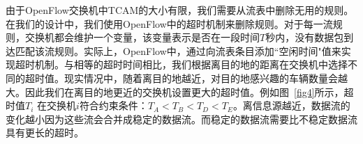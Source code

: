 \documentclass{ctexart}
\begin{document}

由于OpenFlow交换机中TCAM的大小有限，我们需要从流表中删除无用的规则。在我们的设计中，我们使用OpenFlow中的超时机制来删除规则。对于每一流规则，交换机都会维护一个变量，该变量表示是否在一段时间$T$秒内，没有数据包到达匹配该流规则。实际上，OpenFlow中，通过向流表条目添加``空闲时间"值来实现超时机制。与相等的超时时间相比，我们根据离目的地的距离在交换机中选择不同的超时值。现实情况中，随着离目的地越近，对目的地感兴趣的车辆数量会越大。因此我们在离目的地更近的交换机设置更大的超时值。例如图~\ref{fig4}所示，超时值$T_{i}$ 在交换机$i$符合约束条件：$ T_{A} < T_{B} < T_{D} < T_{E}$。离信息源越近，数据流的变化越小因为这些流会合并成稳定的数据流。而稳定的数据流需要比不稳定数据流具有更长的超时。
\end{document}
